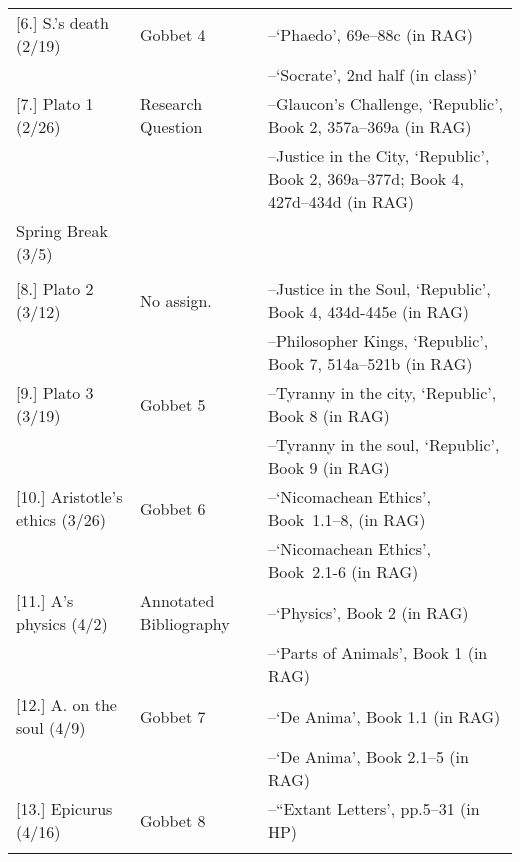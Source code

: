 \documentclass[article,oneside]{memoir}
\begin{document}
\begin{center}
\begin{longtable}{p{4.5cm}p{2cm}p{6cm}}
[6.] S.'s death (2/19)	   	& Gobbet 4		 & --`Phaedo', 69e--88c  (in RAG)   \\
			        					& 				 & --`Socrate', 2nd half (in class)' \\ [1.8\baselineskip]
  
[7.] Plato 1 (2/26)			 			& Research Question		& --Glaucon's Challenge, `Republic', Book 2, 357a--369a (in RAG)  \\
				     			 	& 	      			& --Justice in the City, `Republic', Book 2, 369a--377d; Book 4, 427d--434d (in RAG) \\  [1.8\baselineskip]

Spring Break (3/5)					& 				 & 	\\
								& 				 &   \\ [1.8\baselineskip]	

[8.] Plato 2	(3/12)					& No assign.		& --Justice in the Soul, `Republic', Book 4, 434d-445e (in RAG)\\
	            						&		      		& --Philosopher Kings, `Republic', Book 7, 514a--521b (in RAG) \\  [1.8\baselineskip]

[9.] Plato 3	(3/19)					& Gobbet 5		& --Tyranny in the city, `Republic', Book 8 (in RAG) \\
		            					&		      		& --Tyranny in the soul, `Republic', Book 9  (in RAG)\\  [1.8\baselineskip]


[10.] Aristotle's ethics	(3/26)			& Gobbet 6		& --`Nicomachean Ethics', Book\ 1.1--8, (in RAG) \\
			    					& 				& --`Nicomachean Ethics', Book\ 2.1-6 (in RAG) \\ [1.8\baselineskip]


[11.] A's physics (4/2)				& Annotated Bibliography		& --`Physics', Book 2 (in RAG) \\ 
				   			  &			      	& --`Parts of Animals', Book 1 (in RAG)  \\ [1.8\baselineskip]

						
[12.] A. on the soul (4/9)	      			& Gobbet 7		&  --`De Anima', Book 1.1 (in RAG) \\
				   			   	&			      	& --`De Anima', Book 2.1--5 (in RAG) \\  [1.8\baselineskip]

						 
[13.] Epicurus (4/16)	    				& Gobbet 8		& --``Extant Letters', pp.5--31 (in HP)\\
			      					&			      	&  \\ [1.8\baselineskip]


\end{longtable}
\end{center}
\end{document}
